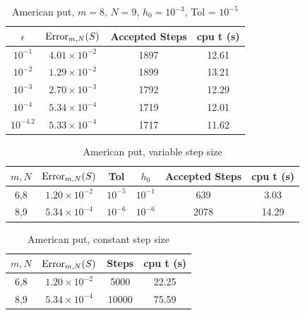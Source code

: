 \documentclass[a4paper,12pt]{article}
\begin{document}
 \begin{table}
\begin{center}
 \caption{American put, $m = 8$, $N = 9$, $h_0 = 10^{-3}$, Tol = $10^{-5}$}
 \begin{tabular}{||c c c c||} 
 \hline
 $\epsilon$ & $\operatorname{Error}_{m,N}(S)$ & Accepted Steps & cpu t (s) \\ [0.5ex] 
 \hline\hline
 $10^{-1}$ &  $4.01 \times 10^{-2}$ & 1897 & 12.61\\ 
 \hline
 $10^{-2}$ & $1.29 \times 10^{-2}$ & 1899 & 13.21 \\
 \hline
 $10^{-3}$ & $2.70 \times 10^{-3}$ & 1792 & 12.29 \\
 \hline
 $10^{-4}$ & $5.34 \times 10^{-4}$ & 1719 & 12.01 \\
 \hline
 $10^{-4.2}$ & $5.33 \times 10^{-4}$ & 1717 & 11.62 \\
 \hline
\end{tabular}
\end{center}
\end{table}

\begin{table}
 \caption{American put, variable step size}
\begin{center}
 \begin{tabular}{||c c c c c c||} 
 \hline
 $m, N$ & $\operatorname{Error}_{m,N}(S)$ & Tol & $h_0$ & Accepted Steps & cpu t (s) \\ [0.5ex] 
 \hline\hline
 6,8 &  $1.20 \times 10^{-2}$ & $10^{-5}$ & $10^{-1}$ & 639 & 3.03\\ 
 \hline
 8,9 & $5.34 \times 10^{-4}$ & $10^{-6}$ & $10^{-6}$ & 2078 & 14.29 \\
 \hline
\end{tabular}
\end{center}
\end{table}

 \begin{table}
\begin{center}
 \caption{American put, constant step size}
 \begin{tabular}{||c c c c||} 
 \hline
 $m, N$ & $\operatorname{Error}_{m,N}(S)$ & Steps & cpu t (s) \\ [0.5ex] 
 \hline\hline
 6,8 &  $1.20 \times 10^{-2}$ & 5000 & 22.25\\ 
 \hline
 8,9 & $5.34 \times 10^{-4}$ & 10000 & 75.59 \\
 \hline
\end{tabular}
\end{center}
\end{table}
\end{document}
